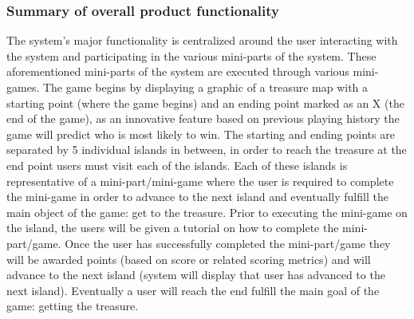\documentclass[]{article}
\begin{document}
\subsubsection{Summary of overall product functionality}
The system's major functionality is centralized around the user interacting with the system and participating in the various mini-parts of the system. These aforementioned mini-parts of the system are executed through various mini-games. The game begins by displaying a graphic of a treasure map with a starting point (where the game begins) and an ending point marked as an X (the end of the game), as an innovative feature based on previous playing history the game will predict who is most likely to win. The starting and ending points are separated by 5 individual islands in between, in order to reach the treasure at the end point users must visit each of the islands. Each of these islands is representative of a mini-part/mini-game where the user is required to complete the mini-game in order to advance to the next island and eventually fulfill the main object of the game: get to the treasure. Prior to executing the mini-game on the island, the users will be given a tutorial on how to complete the mini-part/game. Once the user has successfully completed the mini-part/game they will be awarded points (based on score or related scoring metrics) and will advance to the next island (system will display that user has advanced to the next island). Eventually a user will reach the end fulfill the main goal of the game: getting the treasure.
\end{document}
